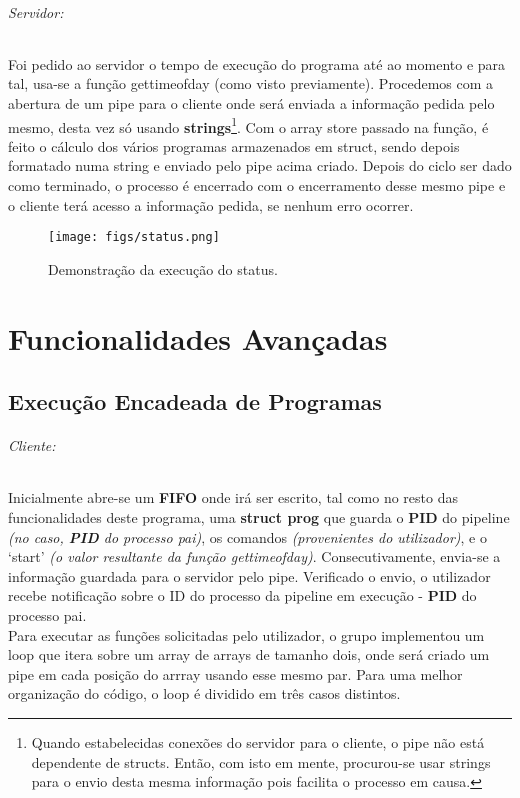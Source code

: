 \documentclass{report}
\begin{document}
\subparagraph{Servidor:}

Foi pedido ao servidor o tempo de execução do programa até ao momento e para tal, usa-se a função gettimeofday (como visto previamente). Procedemos com a abertura de um pipe para o cliente onde será enviada a informação pedida pelo mesmo, desta vez só usando \textbf{strings}\footnote{Quando estabelecidas conexões do servidor para o cliente, o pipe não está dependente de structs. Então, com isto em mente, procurou-se usar strings para o envio desta mesma informação pois facilita o processo em causa.}.
Com o array store passado na função, é feito o cálculo dos vários programas armazenados em struct, sendo depois formatado numa string e enviado pelo pipe acima criado. Depois do ciclo ser dado como terminado, o processo é encerrado com o encerramento desse mesmo pipe e o cliente terá acesso a informação pedida, se nenhum erro ocorrer.\\

\begin{figure}[h]
    \centering
    \texttt{[image: figs/status.png]}
    \caption{Demonstração da execução do status.}
    \label{f}
\end{figure}

\newpage
\chapter{Funcionalidades Avançadas}
\section{Execução Encadeada de Programas}

\subparagraph{Cliente:} Inicialmente abre-se um \textbf{FIFO} onde irá ser escrito, tal como no resto das funcionalidades deste programa, uma \textbf{struct prog} que guarda o \textbf{PID} do pipeline \textit{(no caso, \textbf{PID} do processo pai)}, os comandos \textit{(provenientes do utilizador)}, e o ‘start’ \textit{(o valor resultante da função gettimeofday)}. Consecutivamente, envia-se a informação guardada para o servidor pelo pipe. Verificado o envio, o utilizador recebe notificação sobre o ID do processo da pipeline em execução - \textbf{PID} do processo pai.\\

Para executar as funções solicitadas pelo utilizador, o grupo implementou um loop que itera sobre um array de arrays de tamanho dois, onde será criado um pipe em cada posição do arrray usando esse mesmo par. Para uma melhor organização do código, o loop é dividido em três casos distintos.
\end{document}
